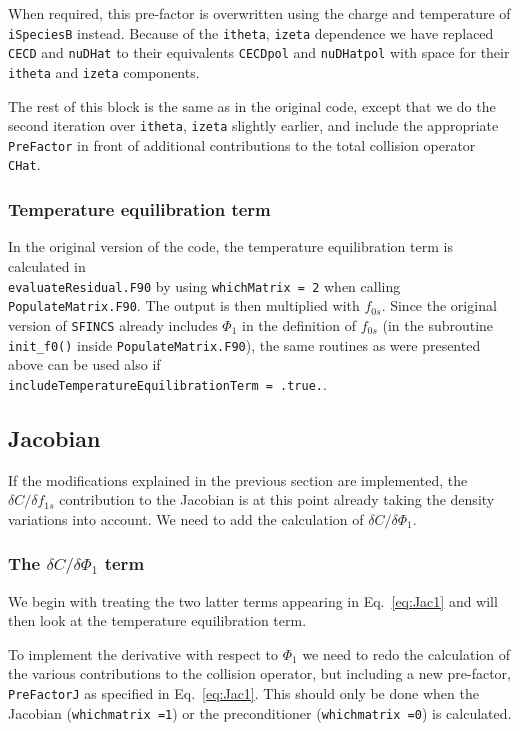 \documentclass[12pt]{article}
\begin{document}
\noindent
When required, this pre-factor is overwritten using the charge and temperature of \texttt{iSpeciesB} instead. 
Because of the \texttt{itheta}, \texttt{izeta} dependence we have replaced \texttt{CECD} and \texttt{nuDHat} to their equivalents \texttt{CECDpol} and \texttt{nuDHatpol} with space for their \texttt{itheta} and \texttt{izeta} components. 

The rest of this block is the same as in the original code, except that we do the second iteration over \texttt{itheta}, \texttt{izeta} slightly earlier, and include the appropriate \texttt{PreFactor} in front of additional contributions to the total collision operator \texttt{CHat}.

\subsubsection*{Temperature equilibration term}
In the original version of the code, the temperature equilibration term is calculated in \\ \texttt{evaluateResidual.F90} by using \texttt{whichMatrix = 2} when calling \texttt{PopulateMatrix.F90}. The output is then multiplied with $f_{0s}$. Since the original version of \texttt{SFINCS} already includes $\Phi_1$ in the definition of $f_{0s}$ (in the subroutine \texttt{init\_f0()} inside \texttt{PopulateMatrix.F90}), the same routines as were presented above can be used also if\\ \texttt{includeTemperatureEquilibrationTerm = .true.}. 

\subsection*{Jacobian}
 If the modifications explained in the previous section are implemented, the $\delta C/\delta f_{1s}$ contribution to the Jacobian is at this point already taking the density variations into account. We need to add the calculation of $\delta C/\delta \Phi_1$.

\subsubsection*{The $\delta C/\delta \Phi_1$ term}
\label{sec:Jac1}
We begin with treating the two latter terms appearing in Eq.~\eqref{eq:Jac1} and will then look at the temperature equilibration term. 

To implement the derivative with respect to $\Phi_1$ we need to redo the calculation of the various contributions to the collision operator, but including a new pre-factor, \texttt{PreFactorJ} as specified in Eq.~\eqref{eq:Jac1}. This should only be done when the Jacobian (\texttt{whichmatrix =1}) or the preconditioner (\texttt{whichmatrix =0}) is calculated.
\end{document}

